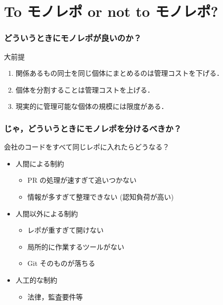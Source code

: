 \section{To モノレポ or not to モノレポ?}

\begin{frame}
    \frametitle{どういうときにモノレポが良いのか？}
    \small
    \begin{block}{大前提}
        \begin{enumerate}
            \item<2-> 関係あるもの同士を同じ個体にまとめるのは管理コストを下げる．
            \item<3-> 個体を分割することは管理コストを上げる．
            \item<4-> 現実的に管理可能な個体の規模には限度がある．
        \end{enumerate}
    \end{block}
\end{frame}

\begin{frame}
    \frametitle{じゃ，どういうときにモノレポを分けるべきか？}
    会社のコードをすべて同じレポに入れたらどうなる？
    \begin{itemize}
        \item<2-> 人間による制約
        \begin{itemize}
            \item<3-> PR の処理が速すぎて追いつかない
            \item<4-> 情報が多すぎて整理できない (認知負荷が高い)
        \end{itemize}
        \item<5-> 人間以外による制約
        \begin{itemize}
            \item<6-> レポが重すぎて開けない
            \item<7-> 局所的に作業するツールがない
            \item<8-> Git そのものが落ちる
        \end{itemize}
        \item<9-> 人工的な制約
        \begin{itemize}
            \item<10-> 法律，監査要件等
        \end{itemize}
    \end{itemize}
\end{frame}

